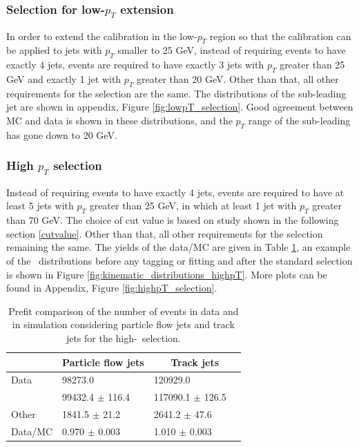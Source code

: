 \documentclass[letterpaper,12pt]{article}
\begin{document}
\subsubsection{Selection for low-$p_T$ extension}
In order to extend the calibration in the low-$p_{T}$ region so that the calibration 
can be applied to jets with $p_{T}$ smaller to 25 GeV, instead of requiring events to 
have exactly 4 jets, events are required to have exactly 3 jets with $p_{T}$ greater 
than 25 GeV and exactly 1 jet with $p_{T}$ greater than 20 GeV. Other than that, 
all other requirements for the selection are the same. The distributions of the sub-leading 
jet are shown in appendix, Figure \ref{fig:lowpT_selection}. Good agreement between MC and data 
is shown in these distributions, and the $p_{T}$ range of the sub-leading has gone down to 20 GeV. 



\subsubsection{High $p_T$ selection}
\label{high_pt_selection}
Instead of requiring events to have exactly 4 jets, events are required to 
have at least 5 jets with $p_{T}$ greater than 25 GeV, in which at least 
1 jet with $p_{T}$ greater than 70 GeV. The choice of cut value is based on 
study shown in the following section \ref{cutvalue}. Other than that, all 
other requirements for the selection remaining the same. 
The yields of the data/MC are given in Table \ref{tab:yields_highpT}, 
an example of the \pt\ distributions before any tagging or fitting and 
after the standard selection is shown in Figure \ref{fig:kinematic_distributions_highpT}. More plots 
can be found in Appendix, Figure \ref{fig:highpT_selection}.

\begin{table}[!b]
	\centering
	\small
	\setlength\tabcolsep{5pt} 
	\begin{tabular}{|l | ll | ll |}
	\hline
	& \multicolumn{2}{c|}{Particle flow jets} & \multicolumn{2}{c|}{Track jets} \\
	\hline
	
	Data    &     98273.0              &   &    120929.0                  &   \\ 
	\ttbar\   &     99432.4 $\pm$  116.4 &   &    117090.1 $\pm$      126.5 &    \\
	Other   &      1841.5 $\pm$   21.2 &   &      2641.2 $\pm$       47.6 &    \\
	Data/MC &   0.970 $\pm$ 0.003      &   &      1.010 $\pm$ 0.003       &    \\
	\hline

	\end{tabular}
	\vspace{0.2cm}
	\caption{Prefit comparison of the number of events in data and in 
	simulation considering particle flow jets and track jets for the high-\pt\ 
	selection.}
	\label{tab:yields_highpT}
	\end{table}
\end{document}

